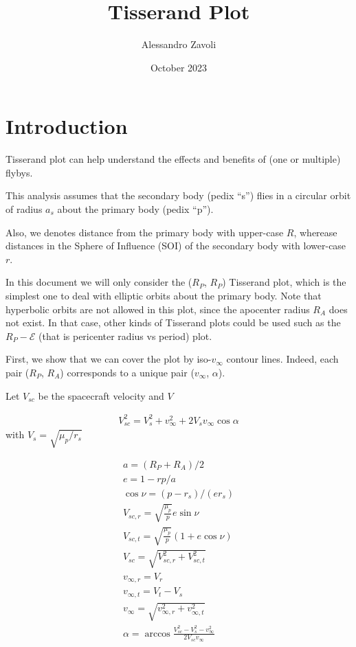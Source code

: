 \documentclass{article}
\title{Tisserand Plot}
\author{Alessandro Zavoli }
\date{October 2023}
\newcommand{\vinf}{v_\infty}
\begin{document}
\maketitle


\section{Introduction}

Tisserand plot can help understand the effects and benefits of (one or multiple) flybys.

This analysis assumes that the secondary body (pedix ``s'') flies in a circular orbit of radius $a_s$ about the primary body (pedix ``p'').

Also, we denotes distance from the primary body with upper-case  $R$, wherease distances in the Sphere of Influence (SOI) of the secondary body with lower-case $r$.


In this document we will only consider the ($R_P$, $R_P$) Tisserand plot, which is the simplest one to deal with elliptic orbits about the primary body.
Note that hyperbolic orbits are not allowed in this plot, since the apocenter radius $R_A$ does not exist.
In that case, other kinds of Tisserand plots could be used such as the $R_P-\mathcal{E}$ (that is pericenter radius vs period) plot.



First, we show that we can cover the plot by iso-$v_\infty$ contour lines.
%
Indeed, each pair ($R_P$, $R_A$) corresponds to a unique pair ($\vinf$, $\alpha$).



Let $V_{sc}$ be the spacecraft velocity and $V$


\begin{align}
    V_{sc}^2 = V_s^2 + \vinf^2 + 2 V_s \vinf \cos\alpha
\end{align}
with $V_s = \sqrt{\mu_p/r_s}$

\begin{align}
    a = (R_P + R_A)/2                              \\
    e = 1- rp/a                                    \\
    \cos\nu = (p-r_s)/(e r_s)                      \\
    V_{sc,r} = \sqrt{\frac{\mu_p}{p}} e \sin\nu    \\
    V_{sc,t} = \sqrt{\frac{\mu_p}{p}} (1+e\cos\nu) \\
    V_{sc} = \sqrt{V_{sc,r}^2+V_{sc,t}^2}
    \\
    v_{\infty,r} = V_r                             \\
    v_{\infty,t} = V_t - V_s                       \\
    \vinf = \sqrt{v_{\infty,r}^2+v_{\infty,t}^2}   \\
    \alpha = \arccos\frac{V_{sc}^2-V_s^2-\vinf^2}{2V_{sc}\vinf}
\end{align}
\end{document}
